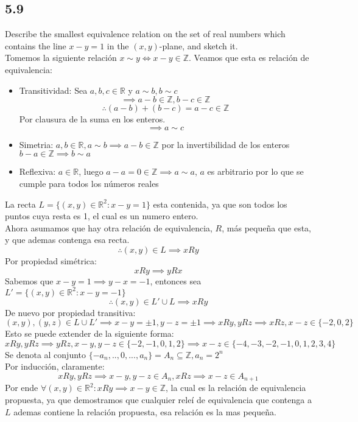 \documentclass[11pt]{article}
\begin{document}
\subsection*{5.9}
Describe the smallest equivalence relation on the set of real numbers which contains the line $x-y=1$ in the $(x,y)$-plane, and sketch it.\\
Tomemos la siguiente relación $x\sim y\iff x-y\in\mathbb{Z}$.
Veamos que esta es relación de equivalencia:
\begin{itemize}
	\item Transitividad: Sea $a,b,c\in\mathbb{R}$ y $a\sim b,b\sim c$
	\[\implies a-b\in\mathbb{Z},b-c\in\mathbb{Z}\]
	\[\therefore (a-b)+(b-c)=a-c\in\mathbb{Z}\]
	Por clausura de la suma en los enteros.
	\[\implies a\sim c\]
	
	\item Simetria: $a,b\in\mathbb{R},a\sim b\implies a-b\in\mathbb{Z}$ por la invertibilidad de los enteros $b-a\in\mathbb{Z}\implies b\sim a$
	
	\item Reflexiva: $a\in\mathbb{R}$, luego $a-a=0\in\mathbb{Z}\implies a\sim a$, $a$ es arbitrario por lo que se cumple para todos los números reales
\end{itemize}
La recta $L=\{(x,y)\in\mathbb{R}^2:x-y=1\}$ esta contenida, ya que son todos los puntos cuya resta es 1, el cual es un numero entero.\\
Ahora asumamos que hay otra relación de equivalencia, $R$, más pequeña que esta, y que ademas contenga esa recta.\\
\[\therefore (x,y)\in L\implies xRy\]
Por propiedad simétrica:
\[ xRy\implies yRx \]
Sabemos que $x-y=1\implies y-x=-1$, entonces sea $L'=\{(x,y)\in\mathbb{R}^2:x-y=-1\}$
\[\therefore (x,y)\in L'\cup L\implies xRy\]
De nuevo por propiedad transitiva:
\[ (x,y),(y,z)\in L\cup L'\implies x-y=\pm 1,y-z=\pm 1\implies xRy, yRz\implies xRz, x-z\in\{-2,0,2\}\]
Esto se puede extender de la siguiente forma:
\[ xRy,yRz\implies yRz, x-y,y-z\in\{-2,-1,0,1,2\}\implies x-z\in\{-4,-3,-2,-1,0,1,2,3,4\} \]
Se denota al conjunto $\{-a_n,..,0,...,a_n\}=A_n\subseteq\mathbb{Z},a_n=2^n$\\
Por inducción, claramente:
\[xRy,yRz\implies x-y,y-z\in A_n, xRz\implies x-z\in A_{n+1}\]
Por ende $\forall (x,y)\in\mathbb{R}^2: xRy\implies x-y\in\mathbb{Z}$, la cual es la relación de equivalencia propuesta, ya que demostramos que cualquier releí de equivalencia que contenga a $L$ ademas contiene la relación propuesta, esa relación es la mas pequeña.
\end{document}
